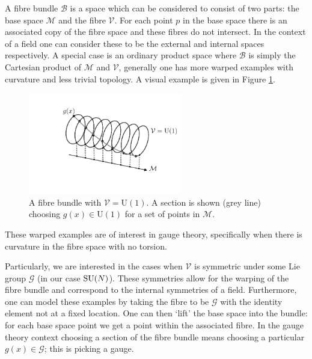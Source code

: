 A fibre bundle $\mathcal{B}$ is a space which can be considered to consist of two parts: the base space $\mathcal{M}$ and the fibre $\mathcal{V}$. For each point $p$ in the base space there is an associated copy of the fibre space and these fibres do not intersect. 
In the context of a field one can consider these to be the external and internal spaces respectively. A special case is an ordinary product space where $\mathcal{B}$ is simply the Cartesian product of $\mathcal{M}$ and $\mathcal{V}$, generally one has more warped examples with curvature and less trivial topology. A visual example is given in Figure \ref{fig:theory:fibre_bundle}.
\begin{figure}[h!]
    \centering
    \includegraphics[width=0.6\textwidth]{figures/theory/fibre_bundle.pdf}
    \caption{A fibre bundle with $\mathcal{V} = \mathrm{U}(1)$. A section is shown (grey line) choosing $g(x)\in\mathrm{U}(1)$ for a set of points in $\mathcal{M}$.}
    \label{fig:theory:fibre_bundle}
\end{figure}
These warped examples are of interest in gauge theory, specifically when there is curvature in the fibre space with no torsion.

Particularly, we are interested in the cases when $\mathcal{V}$ is symmetric under some Lie group $\mathcal{G}$ (in our case ${\mathrm{SU}(N)}$). 
These symmetries allow for the warping of the fibre bundle and correspond to the internal symmetries of a field. 
Furthermore, one can model these examples by taking the fibre to be $\mathcal{G}$ with the identity element not at a fixed location. 
One can then `lift' the base space into the bundle: for each base space point we get a point within the associated fibre. In the gauge theory context choosing a section of the fibre bundle means choosing a particular $g(x)\in\mathcal{G}$; this is picking a gauge. 


